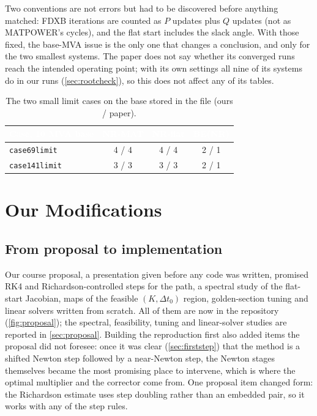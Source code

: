 \documentclass[11pt,a4paper]{article}
\newcommand{\thead}[1]{\textcolor{white}{\sffamily\bfseries\small #1}}
\newcommand{\headrow}{\rowcolor{navy}}
\newcommand{\code}[1]{\texttt{#1}}
\begin{document}
Two conventions are not errors but had to be discovered before anything matched: FDXB iterations are
counted as $P$ updates plus $Q$ updates (not as MATPOWER's cycles), and the flat start includes the slack
angle. With those fixed, the base-MVA issue is the only one that changes a conclusion, and only for the
two smallest systems. The paper does not say whether its converged runs reach the intended operating
point; with its own settings all nine of its systems do in our runs (\cref{sec:rootcheck}), so this does
not affect any of its tables.

\begin{table}[h]
\centering
\caption[Table 7 on the stored 10 MVA base]{The two small limit cases on the base stored in the file (ours / paper).}
\label{tab:t7native}
\small
\begin{tabular}{@{}l c c c@{}}
\toprule
\headrow \thead{Case, 10 MVA base} & \thead{NR-MAT} & \thead{NR-flat} & \thead{BE(NR)} \\
\midrule
\code{case69limit}  & 4 / 4 & 4 / 4 & 2 / 1 \\
\code{case141limit} & 3 / 3 & 3 / 3 & 2 / 1 \\
\bottomrule
\end{tabular}
\end{table}

\section{Our Modifications}\label{sec:mods}

\subsection{From proposal to implementation}
Our course proposal, a presentation given before any code was written, promised RK4 and Richardson-controlled steps for the path, a
spectral study of the flat-start Jacobian, maps of the feasible $(K,\Delta t_0)$ region, golden-section
tuning and linear solvers written from scratch. All of them are now in the repository
(\cref{fig:proposal}); the spectral, feasibility, tuning and linear-solver studies are reported in
\cref{sec:proposal}. Building the reproduction first also added items the proposal did not foresee: once
it was clear (\cref{sec:firststep}) that the method is a shifted Newton step followed by a near-Newton step,
the Newton stages themselves became the most promising place to intervene, which is where the optimal
multiplier and the corrector come from. One proposal item changed form: the Richardson estimate uses step
doubling rather than an embedded pair, so it works with any of the step rules.
\end{document}
